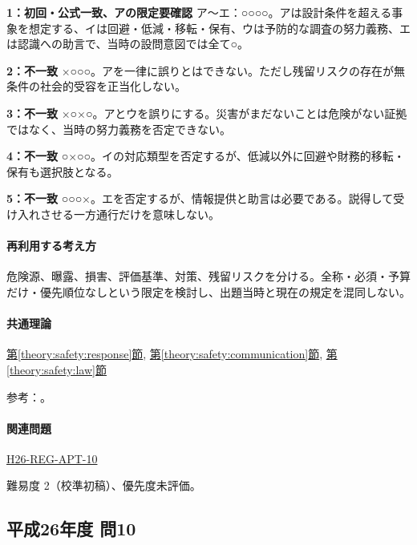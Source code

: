 \noindent\textbf{1：初回・公式一致、アの限定要確認} ア〜エ：○○○○。アは設計条件を超える事象を想定する、イは回避・低減・移転・保有、ウは予防的な調査の努力義務、エは認識への助言で、当時の設問意図では全て○。\par

\noindent\textbf{2：不一致} ×○○○。アを一律に誤りとはできない。ただし残留リスクの存在が無条件の社会的受容を正当化しない。\par

\noindent\textbf{3：不一致} ×○×○。アとウを誤りにする。災害がまだないことは危険がない証拠ではなく、当時の努力義務を否定できない。\par

\noindent\textbf{4：不一致} ○×○○。イの対応類型を否定するが、低減以外に回避や財務的移転・保有も選択肢となる。\par

\noindent\textbf{5：不一致} ○○○×。エを否定するが、情報提供と助言は必要である。説得して受け入れさせる一方通行だけを意味しない。\par

\paragraph{再利用する考え方} 危険源、曝露、損害、評価基準、対策、残留リスクを分ける。全称・必須・予算だけ・優先順位なしという限定を検討し、出題当時と現在の規定を混同しない。

\paragraph{共通理論} \hyperref[theory:safety:response]{第\ref*{theory:safety:response}節}, \hyperref[theory:safety:communication]{第\ref*{theory:safety:communication}節}, \hyperref[theory:safety:law]{第\ref*{theory:safety:law}節}

\par 参考：\cite{saf_ra2006,saf_fsc_glossary}。

\paragraph{関連問題} \hyperref[q:h26-reg-apt-10]{H26-REG-APT-10}

\par 難易度 2（校準初稿）、優先度未評価。

\subsection{平成26年度 問10}
\label{q:h26-reg-apt-10}

